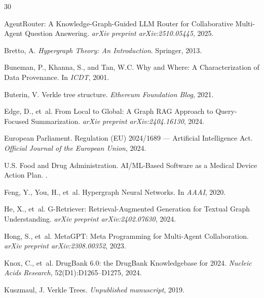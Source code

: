 \documentclass[11pt,a4paper]{article}
\begin{document}

\begin{thebibliography}{30}

AgentRouter: A Knowledge-Graph-Guided LLM Router for Collaborative Multi-Agent Question Answering.
\newblock \emph{arXiv preprint arXiv:2510.05445}, 2025.

Bretto, A.
\newblock \emph{Hypergraph Theory: An Introduction}.
\newblock Springer, 2013.

Buneman, P., Khanna, S., and Tan, W.C.
\newblock Why and Where: A Characterization of Data Provenance.
\newblock In \emph{ICDT}, 2001.

Buterin, V.
\newblock Verkle tree structure.
\newblock \emph{Ethereum Foundation Blog}, 2021.

Edge, D., et~al.
\newblock From Local to Global: A Graph RAG Approach to Query-Focused Summarization.
\newblock \emph{arXiv preprint arXiv:2404.16130}, 2024.

{European Parliament}.
\newblock Regulation (EU) 2024/1689 --- Artificial Intelligence Act.
\newblock \emph{Official Journal of the European Union}, 2024.

{U.S. Food and Drug Administration}.
\newblock AI/ML-Based Software as a Medical Device Action Plan.
.

Feng, Y., You, H., et~al.
\newblock Hypergraph Neural Networks.
\newblock In \emph{AAAI}, 2020.

He, X., et~al.
\newblock G-Retriever: Retrieval-Augmented Generation for Textual Graph Understanding.
\newblock \emph{arXiv preprint arXiv:2402.07630}, 2024.

Hong, S., et~al.
\newblock MetaGPT: Meta Programming for Multi-Agent Collaboration.
\newblock \emph{arXiv preprint arXiv:2308.00352}, 2023.

Knox, C., et~al.
\newblock DrugBank 6.0: the DrugBank Knowledgebase for 2024.
\newblock \emph{Nucleic Acids Research}, 52(D1):D1265--D1275, 2024.

Kuszmaul, J.
\newblock Verkle Trees.
\newblock \emph{Unpublished manuscript}, 2019.


\end{thebibliography}
\end{document}
